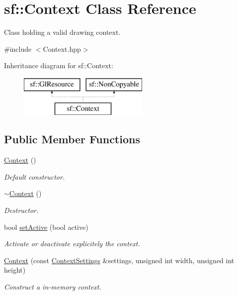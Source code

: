 \hypertarget{classsf_1_1Context}{\section{sf\-:\-:Context Class Reference}
\label{classsf_1_1Context}
}


Class holding a valid drawing context.  




{\ttfamily \#include $<$Context.\-hpp$>$}

Inheritance diagram for sf\-:\-:Context\-:\begin{figure}[H]
\begin{center}
\leavevmode
\includegraphics[height=2.000000cm]{classsf_1_1Context}
\end{center}
\end{figure}
\subsection*{Public Member Functions}
\begin{DoxyCompactItemize}
\item 
\hyperlink{classsf_1_1Context_aba22797a790706ca2c5c04ee39f2b555}{Context} ()
\begin{DoxyCompactList}\small\item\em Default constructor. \end{DoxyCompactList}\item 
\hyperlink{classsf_1_1Context_a805b1bbdb3e52b1fda7c9bf2cd6ca86b}{$\sim$\-Context} ()
\begin{DoxyCompactList}\small\item\em Destructor. \end{DoxyCompactList}\item 
bool \hyperlink{classsf_1_1Context_a0806f915ea81ae1f4e8135a7a3696562}{set\-Active} (bool active)
\begin{DoxyCompactList}\small\item\em Activate or deactivate explicitely the context. \end{DoxyCompactList}\item 
\hyperlink{classsf_1_1Context_a2a9e3529e48919120e6b6fc10bad296c}{Context} (const \hyperlink{structsf_1_1ContextSettings}{Context\-Settings} \&settings, unsigned int width, unsigned int height)
\begin{DoxyCompactList}\small\item\em Construct a in-\/memory context. \end{DoxyCompactList}\end{DoxyCompactItemize}


